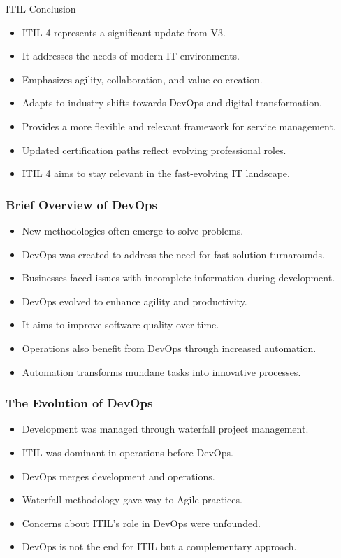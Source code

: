 \documentclass[aspectratio=169, table]{beamer}
\begin{document}
\begin{frame}{ITIL Conclusion}
	\begin{itemize}
		\item ITIL 4 represents a significant update from V3.
		\item It addresses the needs of modern IT environments.
		\item Emphasizes agility, collaboration, and value co-creation.
		\item Adapts to industry shifts towards DevOps and digital transformation.
		\item Provides a more flexible and relevant framework for service management.
		\item Updated certification paths reflect evolving professional roles.
		\item ITIL 4 aims to stay relevant in the fast-evolving IT landscape.
	\end{itemize}
\end{frame}

\begin{frame}
	\frametitle{Brief Overview of DevOps}
	\begin{itemize}
		\item New methodologies often emerge to solve problems.
		\item DevOps was created to address the need for fast solution turnarounds.
		\item Businesses faced issues with incomplete information during development.
		\item DevOps evolved to enhance agility and productivity.
		\item It aims to improve software quality over time.
		\item Operations also benefit from DevOps through increased automation.
		\item Automation transforms mundane tasks into innovative processes.
	\end{itemize}
\end{frame}

\begin{frame}
	\frametitle{The Evolution of DevOps}
	\begin{itemize}
		\item Development was managed through waterfall project management.
		\item ITIL was dominant in operations before DevOps.
		\item DevOps merges development and operations.
		\item Waterfall methodology gave way to Agile practices.
		\item Concerns about ITIL’s role in DevOps were unfounded.
		\item DevOps is not the end for ITIL but a complementary approach.
	\end{itemize}
\end{frame}
\end{document}
